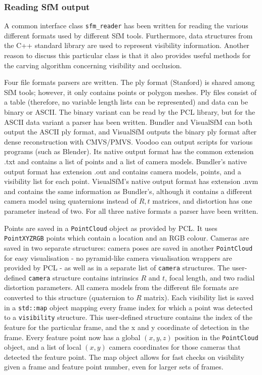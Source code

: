 \clearpage
\subsubsection{Reading SfM output}
A common interface class \texttt{sfm\_reader} has been written for reading the various different formats used by different SfM tools. Furthermore, data structures from the C++ standard library are used to represent visibility information. Another reason to discuss this particular class is that it also provides useful methods for the carving algorithm concerning visibility and occlusion.

Four file formats parsers are written. The ply format (Stanford) is shared among SfM tools; however, it only contains points or polygon meshes. Ply files consist of a table (therefore, no variable length lists can be represented) and data can be binary or ASCII. The binary variant can be read by the PCL library, but for the ASCII data variant a parser has been written. Bundler and VisualSfM can both output the ASCII ply format, and VisualSfM outputs the binary ply format after dense reconstruction with CMVS/PMVS. Voodoo can output scripts for various programs (such as Blender). Its native output format has the common extension .txt and contains a list of points and a list of camera models.  Bundler's native output format has extension .out and contains camera models, points, and a visibility list for each point. VisualSfM's native output format has extension .nvm and contains the same information as Bundler's, although it contains a different camera model using quaternions instead of $R, t$ matrices, and distortion has one parameter instead of two. For all three native formats a parser have been written.

Points are saved in a \texttt{PointCloud} object as provided by PCL. It uses \texttt{PointXYZRGB} points which contain a location and an RGB colour. Cameras are saved in two separate structures: camera poses are saved in another \texttt{PointCloud} for easy visualisation - no pyramid-like camera visualisation wrappers are provided by PCL - as well as in a separate list of \texttt{camera} structures. The user-defined \texttt{camera} structure contains intrinsics $R$ and $t$, focal length, and two radial distortion parameters. All camera models from the different file formats are converted to this structure (\eg quaternion to $R$ matrix). Each visibility list is saved in a \texttt{std::map} object mapping every frame index for which a point was detected to a \texttt{visibility} structure. This user-defined structure contains the index of the feature for the particular frame, and the x and y coordinate of detection in the frame. Every feature point now has a global $(x,y,z)$ position in the \texttt{PointCloud} object, and a list of local $(x,y)$ camera coordinates for those cameras that detected the feature point. The map object allows for fast checks on visibility given a frame and feature point number, even for larger sets of frames.

